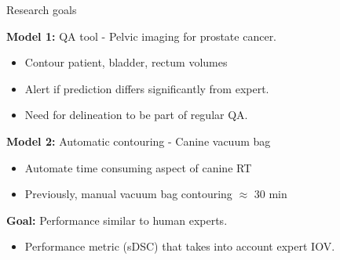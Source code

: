 \documentclass[9pt]{beamer}
\begin{document}
\begin{frame}{Research goals}

\textbf{Model 1:} QA tool - Pelvic imaging for prostate cancer.
\begin{itemize}
\item Contour patient, bladder, rectum volumes
\item Alert if prediction differs significantly from expert.
\item Need for delineation to be part of regular QA.\footnotemark[4]

\end{itemize}
\vspace{4mm}

\textbf{Model 2:} Automatic contouring - Canine vacuum bag
\begin{itemize}
\item Automate time consuming aspect of canine RT
\item Previously, manual vacuum bag contouring $\approx$ 30 min
\end{itemize}
\vspace{3mm}

\textbf{Goal:} Performance similar to human experts.
\begin{itemize}
\item Performance metric (sDSC) that takes into account expert IOV.\footnotemark[3]
\end{itemize}
\end{frame}

\end{document}
